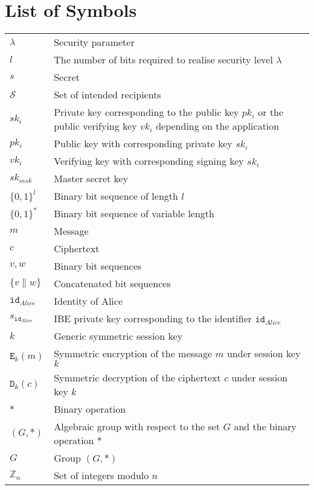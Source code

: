 \documentclass[master=eelt,masteroption=em]{kulemt}
\theoremstyle{plain}
\theoremstyle{definition}
\newcommand{\id}[1]{\ensuremath{\mathtt{id}_{#1}}}
\begin{document}
\chapter{List of Symbols}
\begin{flushleft}
 \renewcommand{\arraystretch}{1.1}
 \begin{tabularx}{\textwidth}{@{}p{30mm}X@{}}
  $\lambda$ & Security parameter \\
  $l$ & The number of bits required to realise security level $\lambda$ \\
  $s$ & Secret \\
  $\mathcal{S}$ & Set of intended recipients \\
  $sk_i$ & Private key corresponding to the public key $pk_i$ or the public verifying key $vk_i$ depending on the application \\
  $pk_i$ & Public key with corresponding private key $sk_i$ \\
  $vk_i$ & Verifying key with corresponding signing key $sk_i$ \\
  $sk_{msk}$ & Master secret key \\
  $\{ 0,1 \}^l$ & Binary bit sequence of length $l$ \\
  $\{ 0,1 \}^*$ & Binary bit sequence of variable length \\
  $m$ & Message \\
  $c$ & Ciphertext \\
  $v, w$ & Binary bit sequences \\
  $\{ v \parallel w \}$ & Concatenated bit sequences \\
  \id{Alice} & Identity of Alice \\ 
  $s_{\id{Alice}}$ & IBE private key corresponding to the identifier \id{Alice} \\
  $k$ & Generic symmetric session key \\
  $\mathtt{E}_k \left( m \right)$ & Symmetric encryption of the message $m$ under session key $k$ \\
  $\mathtt{D}_k \left( c \right)$ & Symmetric decryption of the ciphertext $c$ under session key $k$ \\
  $*$ & Binary operation \\
  $\left( G, * \right)$ & Algebraic group with respect to the set $G$ and the binary operation $*$ \\
  $G$ & Group $\left( G, * \right)$ \\
  $\mathbb{Z}_n$ & Set of integers modulo $n$ \\
    \end{tabularx}
\end{flushleft}
\end{document}
